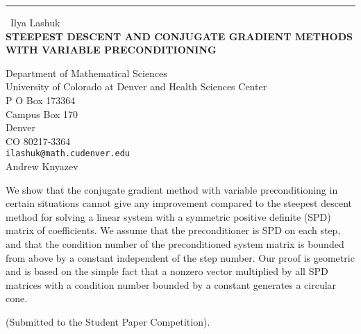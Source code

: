 \documentclass{report}
\begin{document}
\begin{center}
\rule{6in}{1pt} \
{\large Ilya Lashuk \\
{\bf STEEPEST DESCENT AND CONJUGATE GRADIENT METHODS WITH VARIABLE PRECONDITIONING}}

Department of Mathematical Sciences \\ University of Colorado at Denver and Health Sciences Center \\ P O Box 173364 \\ Campus Box 170 \\ Denver \\ CO 80217-3364
\\
{\tt ilashuk@math.cudenver.edu}\\
Andrew Knyazev\end{center}

We show that the conjugate gradient method with variable preconditioning
in certain situations cannot give any improvement compared to the
steepest descent method for solving a
linear system with a symmetric positive definite (SPD) matrix of
coefficients. We assume that the
preconditioner is SPD on each step, and that the condition number of the
preconditioned system
matrix is bounded from above by a constant independent of the step
number. Our proof is geometric
and is based on the simple fact that a nonzero vector multiplied by all
SPD matrices with a condition
number bounded by a constant generates a circular cone.

(Submitted to the Student Paper Competition).
\end{document}

